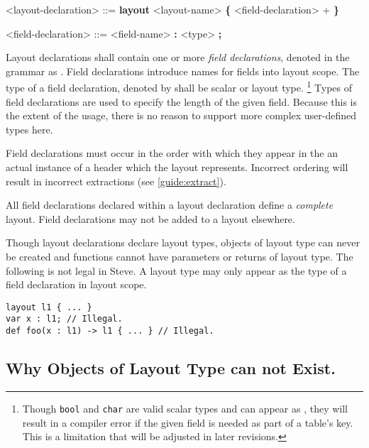 \begin{minip}
\begin{grammar}
<layout-declaration> ::=
\textbf{layout} <layout-name>
\textbf{\{}
	<field-declaration> +
\textbf{\}}

<field-declaration> ::=
<field-name> \textbf{:} <type> \textbf{;}
\end{grammar}
\end{minip}

Layout declarations shall contain one or more \textit{field declarations}, denoted in the grammar as . Field declarations introduce names for fields into layout scope. The type of a field declaration, denoted by  shall be scalar or layout type. \footnote{Though \texttt{bool} and \texttt{char} are valid scalar types and can appear as , they will result in a compiler error if the given field is needed as part of a table's key. This is a limitation that will be adjusted in later revisions.} Types of field declarations are used to specify the length of the given field. Because this is the extent of the usage, there is no reason to support more complex user-defined types here.

Field declarations must occur in the order with which they appear in the an actual instance of a header which the layout represents. Incorrect ordering will result in incorrect extractions (see \ref{guide:extract}).

All field declarations declared within a layout declaration define a \textit{complete} layout. Field declarations may not be added to a layout elsewhere.

Though layout declarations declare layout types, objects of layout type can never be created and functions cannot have parameters or returns of layout type. The following is not legal in Steve. A layout type may only appear as the type of a field declaration in layout scope.

\begin{minip}
\begin{lstlisting}
layout l1 { ... }
var x : l1; // Illegal.
def foo(x : l1) -> l1 { ... } // Illegal.
\end{lstlisting}
\end{minip}

\subsection{Why Objects of Layout Type can not Exist.}

